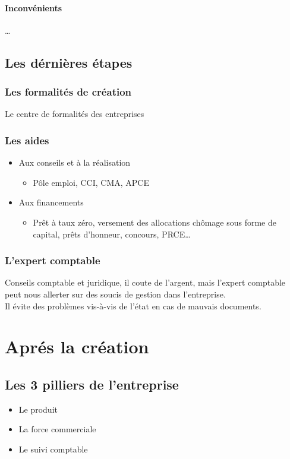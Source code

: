 \documentclass[12pt,a4paper,openany]{report}
\begin{document}
			\subsubsection{Inconvénients}
				\ldots
	\section{Les dérnières étapes}
		\subsection{Les formalités de création}
		Le centre de formalités des entreprises
		\subsection{Les aides}
	\begin{itemize}
		\item Aux conseils et à la réalisation
			\begin{itemize}
				\item Pôle emploi, CCI, CMA, APCE
			\end{itemize}
		\item Aux financements
			\begin{itemize}
				\item Prêt à taux zéro, versement des allocations chômage sous forme de capital, prêts d'honneur, concours, PRCE\ldots
			\end{itemize}
	\end{itemize}
	\subsection{L'expert comptable}
		Conseils comptable et juridique, il coute de l'argent, mais l'expert comptable peut nous allerter sur des soucis de gestion dans l'entreprise. \\
		Il évite des problèmes vis-à-vis de l'état en cas de mauvais documents. 
	\chapter{Aprés la création}
	\section{Les 3 pilliers de l'entreprise}
\begin{itemize}
	\item Le produit
	\item La force commerciale
	\item Le suivi comptable
\end{itemize}
\end{document}

